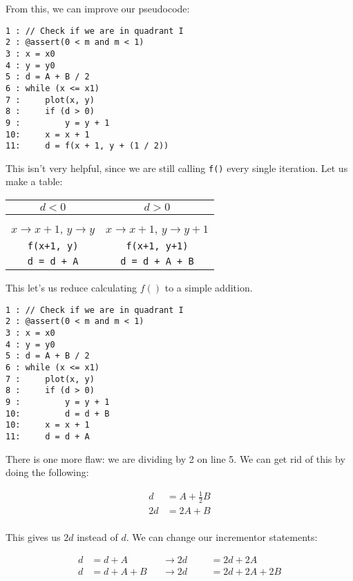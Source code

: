 \documentclass[11pt,fleqn]{article}
\theoremstyle{definition}
\begin{document}
From this, we can improve our pseudocode:

\begin{verbatim}
1 : // Check if we are in quadrant I
2 : @assert(0 < m and m < 1)
3 : x = x0
4 : y = y0
5 : d = A + B / 2
6 : while (x <= x1)
7 :     plot(x, y)
8 :     if (d > 0)
9 :         y = y + 1
10:     x = x + 1
11:     d = f(x + 1, y + (1 / 2))
\end{verbatim}

This isn't very helpful, since we are still calling \verb|f()| every single
iteration. Let us make a table:

\begin{table}[!htpb]
    \centering
    \label{bresenham1}
    \begin{tabular}{c|c}
        $d < 0$ & $d > 0$ \\ \hline \\
        $x \rightarrow x + 1$, $y \rightarrow y$ & $x \rightarrow x + 1$, $y
        \rightarrow y + 1$ \\
        \texttt{f(x+1, y)} & \texttt{f(x+1, y+1)} \\
        \texttt{d = d + A} & \texttt{d = d + A + B}
    \end{tabular}
\end{table}

This let's us reduce calculating $f()$ to a simple addition.

\begin{verbatim}
1 : // Check if we are in quadrant I
2 : @assert(0 < m and m < 1)
3 : x = x0
4 : y = y0
5 : d = A + B / 2
6 : while (x <= x1)
7 :     plot(x, y)
8 :     if (d > 0)
9 :         y = y + 1
10:         d = d + B
10:     x = x + 1
11:     d = d + A
\end{verbatim}

There is one more flaw: we are dividing by 2 on line 5. We can get rid of this by
doing the following:

\begin{align*}
    d &= A + \frac{1}{2}B \\
    2d &= 2A + B \\
\end{align*}

This gives us $2d$ instead of $d$. We can change our incrementor statements:

\begin{align*}
    d &= d + A &&\rightarrow 2d &&&= 2d + 2A \\
    d &= d + A + B &&\rightarrow 2d &&&= 2d + 2A + 2B
\end{align*}
\end{document}
